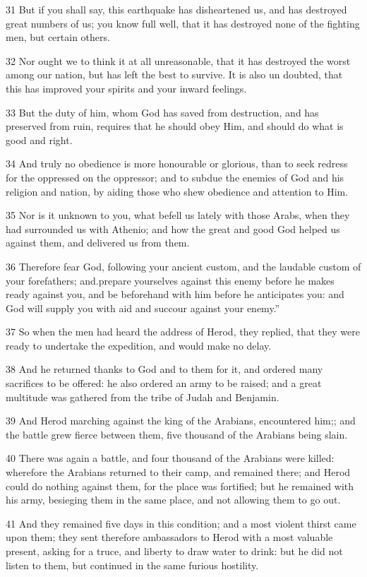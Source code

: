 31 But if you shall say, this earthquake has disheartened us, and has destroyed great numbers of us; you know full well, that it has destroyed none of the fighting men, but certain others. 

32 Nor ought we to think it at all unreasonable, that it has destroyed the worst among our nation, but has left the best to survive. It is also un doubted, that this has improved your spirits and your inward feelings. 

33 But the duty of him, whom God has saved from destruction, and has preserved from ruin, requires that he should obey Him, and should do what is good and right. 

34 And truly no obedience is more honourable or glorious, than to seek redress for the oppressed on the oppressor; and to subdue the enemies of God and his religion and nation, by aiding those who shew obedience and attention to Him. 

35 Nor is it unknown to you, what befell us lately with those Arabs, when they had surrounded us with Athenio; and how the great and good God helped us against them, and delivered us from them. 

36 Therefore fear God, following your ancient custom, and the laudable custom of your forefathers; and.prepare yourselves against this enemy before he makes ready against you, and be beforehand with him before he anticipates you: and God will supply you with aid and succour against your enemy.” 

37 So when the men had heard the address of Herod, they replied, that they were ready to undertake the expedition, and would make no delay. 

38 And he returned thanks to God and to them for it, and ordered many sacrifices to be offered: he also ordered an army to be raised; and a great multitude was gathered from the tribe of Judah and Benjamin. 

39 And Herod marching against the king of the Arabians, encountered him;; and the battle grew fierce between them, five thousand of the Arabians being slain. 

40 There was again a battle, and four thousand of the Arabians were killed: wherefore the Arabians returned to their camp, and remained there; and Herod could do nothing against them, for the place was fortified; but he remained with his army, besieging them in the same place, and not allowing them to go out. 

41 And they remained five days in this condition; and a most violent thirst came upon them; they sent therefore ambassadors to Herod with a most valuable present, asking for a truce, and liberty to draw water to drink: but he did not listen to them, but continued in the same furious hostility. 

